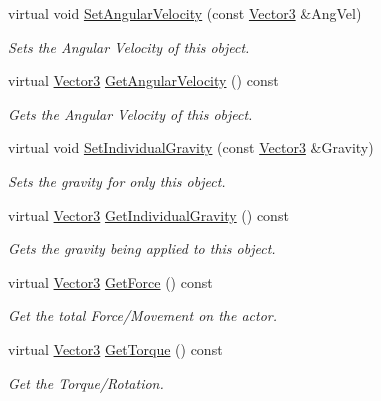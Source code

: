 \begin{DoxyCompactItemize}
virtual void \hyperlink{classphys_1_1ActorRigidPhysicsSettings_a222c6ea9a61937cf7cb053c194981e41}{SetAngularVelocity} (const \hyperlink{classphys_1_1Vector3}{Vector3} \&AngVel)
\begin{DoxyCompactList}\small\item\em Sets the Angular Velocity of this object. \item\end{DoxyCompactList}\item 
virtual \hyperlink{classphys_1_1Vector3}{Vector3} \hyperlink{classphys_1_1ActorRigidPhysicsSettings_a20e3be137706e477f94b66ed2dbb56de}{GetAngularVelocity} () const 
\begin{DoxyCompactList}\small\item\em Gets the Angular Velocity of this object. \item\end{DoxyCompactList}\item 
virtual void \hyperlink{classphys_1_1ActorRigidPhysicsSettings_af595556bb71a257785038b6c2da379a9}{SetIndividualGravity} (const \hyperlink{classphys_1_1Vector3}{Vector3} \&Gravity)
\begin{DoxyCompactList}\small\item\em Sets the gravity for only this object. \item\end{DoxyCompactList}\item 
virtual \hyperlink{classphys_1_1Vector3}{Vector3} \hyperlink{classphys_1_1ActorRigidPhysicsSettings_ac581da07915d7c09d92b251f60b17090}{GetIndividualGravity} () const 
\begin{DoxyCompactList}\small\item\em Gets the gravity being applied to this object. \item\end{DoxyCompactList}\item 
virtual \hyperlink{classphys_1_1Vector3}{Vector3} \hyperlink{classphys_1_1ActorRigidPhysicsSettings_a6e9b49a990b04411e5a2a29372cafa85}{GetForce} () const 
\begin{DoxyCompactList}\small\item\em Get the total Force/Movement on the actor. \item\end{DoxyCompactList}\item 
virtual \hyperlink{classphys_1_1Vector3}{Vector3} \hyperlink{classphys_1_1ActorRigidPhysicsSettings_a0e72a68536fa4e48b489bd069f5fba82}{GetTorque} () const 
\begin{DoxyCompactList}\small\item\em Get the Torque/Rotation. \item\end{DoxyCompactList}\item 

\end{DoxyCompactItemize}
